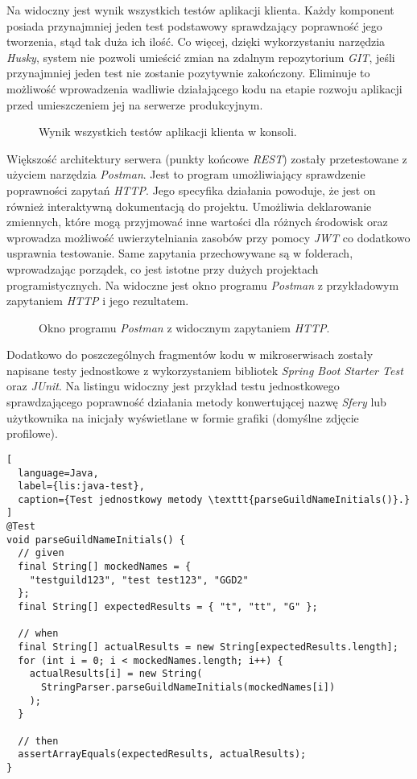 Na  widoczny jest wynik wszystkich testów aplikacji klienta. Każdy komponent posiada
przynajmniej jeden test podstawowy sprawdzający poprawność jego tworzenia, stąd tak duża ich ilość. Co więcej, dzięki
wykorzystaniu narzędzia \textit{Husky}, system nie pozwoli umieścić zmian na zdalnym repozytorium \textit{GIT}, jeśli
przynajmniej jeden test nie zostanie pozytywnie zakończony. Eliminuje to możliwość wprowadzenia wadliwie działającego
kodu na etapie rozwoju aplikacji przed umieszczeniem jej na serwerze produkcyjnym.
%
\begin{figure}[H]
  \centering
  \caption{Wynik wszystkich testów aplikacji klienta w konsoli.}
  \label{fig:karma-output}
\end{figure}


Większość architektury serwera (punkty końcowe \textit{REST}) zostały przetestowane z użyciem narzędzia
\textit{Postman}. Jest to program umożliwiający sprawdzenie poprawności zapytań \textit{HTTP}. Jego specyfika działania
powoduje, że jest on również interaktywną dokumentacją do projektu. Umożliwia deklarowanie zmiennych, które mogą
przyjmować inne wartości dla różnych środowisk oraz wprowadza możliwość uwierzytelniania zasobów przy pomocy
\textit{JWT} co dodatkowo usprawnia testowanie. Same zapytania przechowywane są w folderach, wprowadzając porządek, co
jest istotne przy dużych projektach programistycznych. Na  widoczne jest okno programu
\textit{Postman} z przykładowym zapytaniem \textit{HTTP} i jego rezultatem.
%
\begin{figure}[H]
  \centering
  \caption{Okno programu \textit{Postman} z widocznym zapytaniem \textit{HTTP}.}
  \label{fig:postman}
\end{figure}

Dodatkowo do poszczególnych fragmentów kodu w mikroserwisach zostały napisane testy jednostkowe z wykorzystaniem
bibliotek \textit{Spring Boot Starter Test} oraz \textit{JUnit}. Na listingu  widoczny jest
przykład testu jednostkowego sprawdzającego poprawność działania metody konwertującej nazwę \textit{Sfery} lub
użytkownika na inicjały wyświetlane w formie grafiki (domyślne zdjęcie profilowe).
%
\begin{lstlisting}[
  language=Java,
  label={lis:java-test},
  caption={Test jednostkowy metody \texttt{parseGuildNameInitials()}.}
]
@Test
void parseGuildNameInitials() {
  // given
  final String[] mockedNames = {
    "testguild123", "test test123", "GGD2"
  };
  final String[] expectedResults = { "t", "tt", "G" };

  // when
  final String[] actualResults = new String[expectedResults.length];
  for (int i = 0; i < mockedNames.length; i++) {
    actualResults[i] = new String(
      StringParser.parseGuildNameInitials(mockedNames[i])
    );
  }

  // then
  assertArrayEquals(expectedResults, actualResults);
}
\end{lstlisting}

